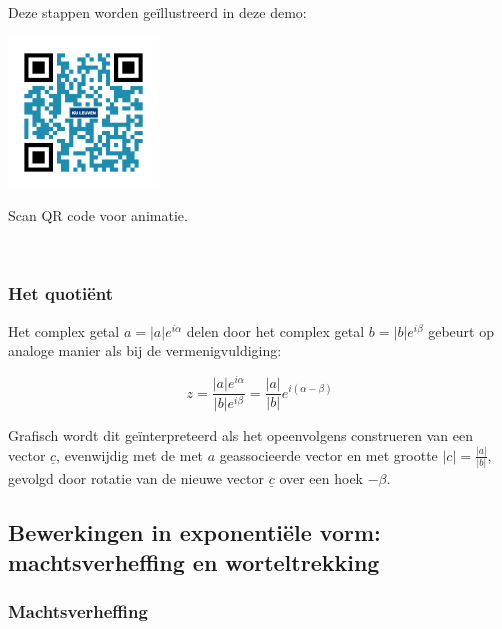 Deze stappen worden ge\"{i}llustreerd in deze demo:\\

\begin{minipage}{.25\linewidth}
	\raggedright
	\includegraphics[width=4cm]{3_gonio_complexe_getallen/inputs/QR_Code_ANIMATIE4_module3}
\end{minipage}
\begin{minipage}{.7\linewidth}
	Scan QR code voor animatie.
\end{minipage}    \\

\subsubsection{Het quoti\"{e}nt}

Het complex getal $a=|a|e^{i\alpha}$ delen door het complex getal $b=|b|e^{i\beta}$ gebeurt op analoge manier als bij de vermenigvuldiging:\\

\begin{eigenschap}
	\begin{framed}
	\[ z=\frac{|a|e^{i\alpha}}{|b|e^{i\beta}}=\frac{|a|}{|b|}e^{i (\alpha - \beta)}  \]
\end{framed}
\end{eigenschap}

Grafisch wordt dit ge\"{i}nterpreteerd als het opeenvolgens construeren van een vector $\underline{c}$, evenwijdig met de met $a$ geassocieerde vector en met grootte $|c|=\frac{|a|}{|b|}$, gevolgd door rotatie van de nieuwe vector $\underline{c}$ over een hoek $-\beta$.\\

\subsection{Bewerkingen in exponenti\"{e}le vorm: machtsverheffing en worteltrekking}

\subsubsection{Machtsverheffing}

